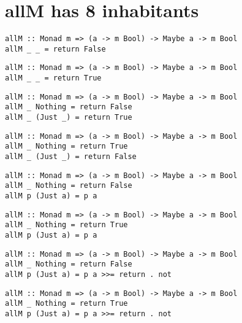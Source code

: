 \appendix
\section{allM has 8 inhabitants}
\tiny
\begin{lstlisting}[style=haskell]
allM :: Monad m => (a -> m Bool) -> Maybe a -> m Bool
allM _ _ = return False
\end{lstlisting}
\begin{lstlisting}[style=haskell]
allM :: Monad m => (a -> m Bool) -> Maybe a -> m Bool
allM _ _ = return True
\end{lstlisting}
\begin{lstlisting}[style=haskell]
allM :: Monad m => (a -> m Bool) -> Maybe a -> m Bool
allM _ Nothing = return False
allM _ (Just _) = return True
\end{lstlisting}
\begin{lstlisting}[style=haskell]
allM :: Monad m => (a -> m Bool) -> Maybe a -> m Bool
allM _ Nothing = return True
allM _ (Just _) = return False
\end{lstlisting}
\begin{lstlisting}[style=haskell]
allM :: Monad m => (a -> m Bool) -> Maybe a -> m Bool
allM _ Nothing = return False
allM p (Just a) = p a
\end{lstlisting}
\begin{lstlisting}[style=haskell]
allM :: Monad m => (a -> m Bool) -> Maybe a -> m Bool
allM _ Nothing = return True
allM p (Just a) = p a
\end{lstlisting}
\begin{lstlisting}[style=haskell]
allM :: Monad m => (a -> m Bool) -> Maybe a -> m Bool
allM _ Nothing = return False
allM p (Just a) = p a >>= return . not
\end{lstlisting}
\begin{lstlisting}[style=haskell]
allM :: Monad m => (a -> m Bool) -> Maybe a -> m Bool
allM _ Nothing = return True
allM p (Just a) = p a >>= return . not
\end{lstlisting}
